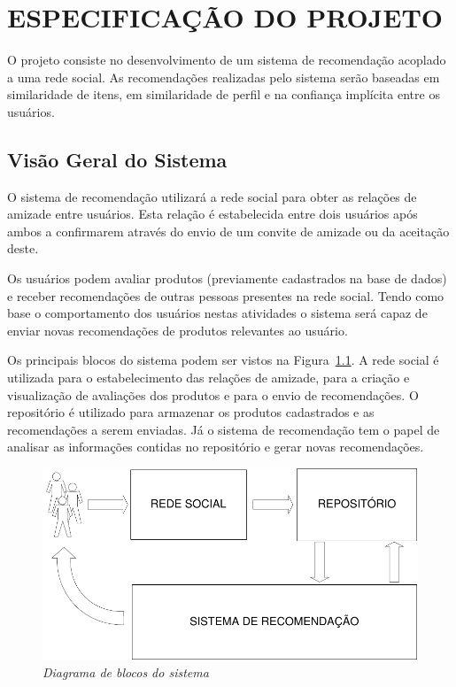 \chapter{ESPECIFICAÇÃO DO PROJETO} %
\label{cha:especificacao_do_projeto}

 O projeto consiste no desenvolvimento de um sistema de recomendação acoplado a uma rede social. As recomendações realizadas pelo sistema serão baseadas em similaridade de itens, em similaridade de perfil e na confiança implícita entre os usuários.

\section{Visão Geral do Sistema} %
\label{sec:visao_do_sistema}

O sistema de recomendação utilizará a rede social para obter as relações de amizade entre usuários. Esta relação é estabelecida entre dois usuários após ambos a confirmarem através do envio de um convite de amizade ou da aceitação deste.

Os usuários podem avaliar produtos (previamente cadastrados na base de dados) e receber recomendações de outras pessoas presentes na rede social. Tendo como base o comportamento dos usuários nestas atividades o sistema será capaz de enviar novas recomendações de produtos relevantes ao usuário.

 Os principais blocos do sistema podem ser vistos na Figura~\ref{fig:escopo}. A rede social é utilizada para o estabelecimento das relações de amizade, para a criação e visualização de avaliações dos produtos e para o envio de recomendações. O repositório é utilizado para armazenar os produtos cadastrados e as recomendações a serem enviadas. Já o sistema de recomendação tem o papel de analisar as informações contidas no repositório e gerar novas recomendações.

\begin{figure}
  \centering
  \includegraphics[width=\textwidth]{imagens/Diagrama_Visao_Geral}
  \caption{\it Diagrama de blocos do sistema}
  \label{fig:escopo}
\end{figure}


